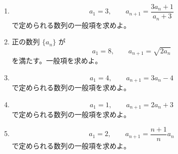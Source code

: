 \begin{enumerate}[label=\textbf{問\arabic*.},leftmargin=3.8em,format=\bookitemlink{practice-basic}{problem}{answer}]
        \item \[
            a_1=3,\qquad
            a_{n+1}=\frac{3a_n+1}{a_n+3}
          \]
              で定められる数列の一般項を求めよ。
        \item 正の数列 \(\{a_n\}\) が
          \[
            a_1=8,\qquad
            a_{n+1}=\sqrt{2a_n}
          \]
              を満たす。一般項を求めよ。
        \item \[
            a_1=4,\qquad a_{n+1}=3a_n-4
          \]
              で定められる数列の一般項を求めよ。
        \item \[
            a_1=1,\qquad a_{n+1}=2a_n+3
          \]
              で定められる数列の一般項を求めよ。
        \item \[
            a_1=2,\qquad
            a_{n+1}=\frac{n+1}{n}a_n
          \]
              で定められる数列の一般項を求めよ。
      \end{enumerate}

